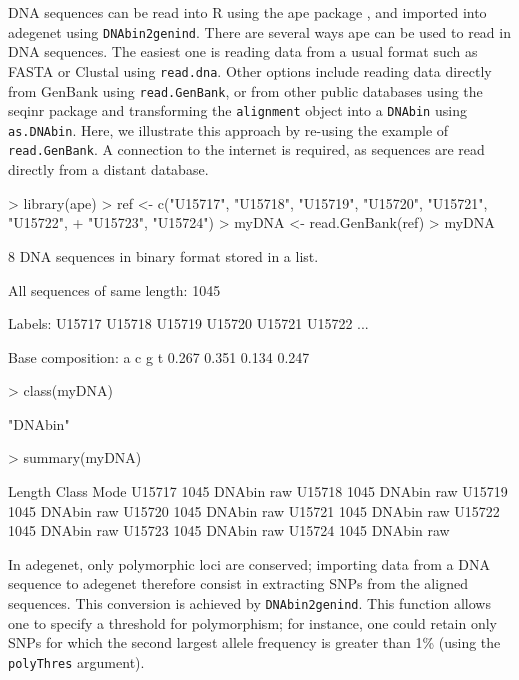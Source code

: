 \documentclass{article}
\begin{document}
DNA sequences can be read into R using the ape package \cite{tj527,np83}, and
imported into adegenet using \texttt{DNAbin2genind}.
There are several ways ape can be used to read in DNA sequences.
The easiest one is reading data from a usual format such as FASTA or Clustal using \texttt{read.dna}.
Other options include reading data directly from GenBank using \texttt{read.GenBank}, or from other
public databases using the seqinr package and transforming the \texttt{alignment} object into a
\texttt{DNAbin} using \texttt{as.DNAbin}.
Here, we illustrate this approach by re-using the example of \texttt{read.GenBank}. A connection to
the internet is required, as sequences are read directly from a distant database.
\begin{Schunk}
\begin{Sinput}
> library(ape)
> ref <- c("U15717", "U15718", "U15719", "U15720", "U15721", "U15722", 
+     "U15723", "U15724")
> myDNA <- read.GenBank(ref)
> myDNA
\end{Sinput}
\begin{Soutput}
8 DNA sequences in binary format stored in a list.

All sequences of same length: 1045 

Labels: U15717 U15718 U15719 U15720 U15721 U15722 ...

Base composition:
    a     c     g     t 
0.267 0.351 0.134 0.247 
\end{Soutput}
\begin{Sinput}
> class(myDNA)
\end{Sinput}
\begin{Soutput}
[1] "DNAbin"
\end{Soutput}
\begin{Sinput}
> summary(myDNA)
\end{Sinput}
\begin{Soutput}
       Length Class  Mode
U15717 1045   DNAbin raw 
U15718 1045   DNAbin raw 
U15719 1045   DNAbin raw 
U15720 1045   DNAbin raw 
U15721 1045   DNAbin raw 
U15722 1045   DNAbin raw 
U15723 1045   DNAbin raw 
U15724 1045   DNAbin raw 
\end{Soutput}
\end{Schunk}
In adegenet, only polymorphic loci are conserved; importing data from a DNA sequence to adegenet
therefore consist in extracting SNPs from the aligned sequences.
This conversion is achieved by \texttt{DNAbin2genind}.
This function allows one to specify a threshold for polymorphism; for instance, one could retain
only SNPs for which the second largest allele frequency is greater than 1\% (using the \texttt{polyThres} argument).
\end{document}
